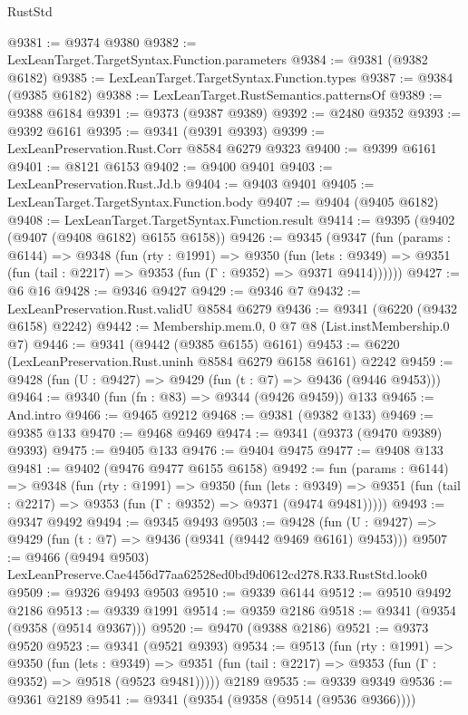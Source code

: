 \begin{lexlean}{RustStd}
\begin{coremodule}
@9381 := @9374 @9380
@9382 := LexLeanTarget.TargetSyntax.Function.parameters
@9384 := @9381 (@9382 @6182)
@9385 := LexLeanTarget.TargetSyntax.Function.types
@9387 := @9384 (@9385 @6182)
@9388 := LexLeanTarget.RustSemantics.patternsOf
@9389 := @9388 @6184
@9391 := @9373 (@9387 @9389)
@9392 := @2480 @9352
@9393 := @9392 @6161
@9395 := @9341 (@9391 @9393)
@9399 := LexLeanPreservation.Rust.Corr @8584 @6279 @9323
@9400 := @9399 @6161
@9401 := @8121 @6153
@9402 := @9400 @9401
@9403 := LexLeanPreservation.Rust.Jd.b
@9404 := @9403 @9401
@9405 := LexLeanTarget.TargetSyntax.Function.body
@9407 := @9404 (@9405 @6182)
@9408 := LexLeanTarget.TargetSyntax.Function.result
@9414 := @9395 (@9402 (@9407 (@9408 @6182) @6155 @6158))
@9426 := @9345
    (@9347
      (fun (params : @6144) =>
      @9348
        (fun (rty : @1991) =>
        @9350
          (fun (lets : @9349) =>
          @9351 (fun (tail : @2217) => @9353 (fun (Γ : @9352) => @9371 @9414))))))
@9427 := @6 @16
@9428 := @9346 @9427
@9429 := @9346 @7
@9432 := LexLeanPreservation.Rust.validU @8584 @6279
@9436 := @9341 (@6220 (@9432 @6158) @2242)
@9442 := Membership.mem.{0, 0} @7 @8 (List.instMembership.{0} @7)
@9446 := @9341 (@9442 (@9385 @6155) @6161)
@9453 := @6220 (LexLeanPreservation.Rust.uninh @8584 @6279 @6158 @6161) @2242
@9459 := @9428 (fun (U : @9427) => @9429 (fun (t : @7) => @9436 (@9446 @9453)))
@9464 := @9340 (fun (fn : @83) => @9344 (@9426 @9459)) @133
@9465 := And.intro
@9466 := @9465 @9212
@9468 := @9381 (@9382 @133)
@9469 := @9385 @133
@9470 := @9468 @9469
@9474 := @9341 (@9373 (@9470 @9389) @9393)
@9475 := @9405 @133
@9476 := @9404 @9475
@9477 := @9408 @133
@9481 := @9402 (@9476 @9477 @6155 @6158)
@9492 := fun (params : @6144) =>
  @9348
    (fun (rty : @1991) =>
    @9350
      (fun (lets : @9349) =>
      @9351 (fun (tail : @2217) => @9353 (fun (Γ : @9352) => @9371 (@9474 @9481)))))
@9493 := @9347 @9492
@9494 := @9345 @9493
@9503 := @9428 (fun (U : @9427) => @9429 (fun (t : @7) => @9436 (@9341 (@9442 @9469 @6161) @9453)))
@9507 := @9466 (@9494 @9503) LexLeanPreserve.Cae4456d77aa62528ed0bd9d0612cd278.R33.RustStd.look0
@9509 := @9326 @9493 @9503
@9510 := @9339 @6144
@9512 := @9510 @9492 @2186
@9513 := @9339 @1991
@9514 := @9359 @2186
@9518 := @9341 (@9354 (@9358 (@9514 @9367)))
@9520 := @9470 (@9388 @2186)
@9521 := @9373 @9520
@9523 := @9341 (@9521 @9393)
@9534 := @9513
    (fun (rty : @1991) =>
    @9350
      (fun (lets : @9349) =>
      @9351 (fun (tail : @2217) => @9353 (fun (Γ : @9352) => @9518 (@9523 @9481)))))
    @2189
@9535 := @9339 @9349
@9536 := @9361 @2189
@9541 := @9341 (@9354 (@9358 (@9514 (@9536 @9366))))

\end{coremodule}
\end{lexlean}

